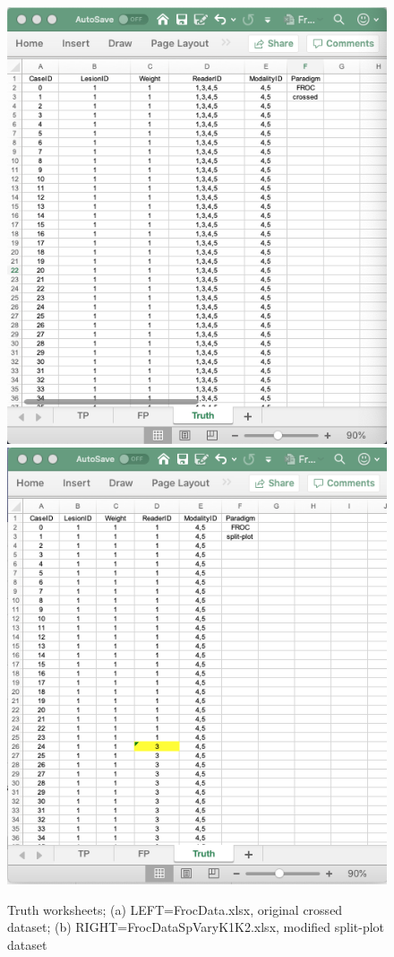 \documentclass[]{book}
\begin{document}
\begin{figure}

{\centering \includegraphics[width=0.5\linewidth,height=0.2\textheight]{images/frocData} \includegraphics[width=0.5\linewidth,height=0.2\textheight]{images/frocDataSpVaryK1K2} 

}

\caption{Truth worksheets; (a) LEFT=FrocData.xlsx, original crossed dataset; (b) RIGHT=FrocDataSpVaryK1K2.xlsx, modified split-plot dataset}\label{fig:frocDataSpVaryK1K2}
\end{figure}
\end{document}
